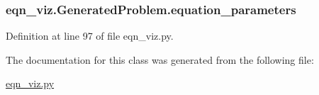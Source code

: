 \subsubsection[{equation\+\_\+parameters}]{\setlength{\rightskip}{0pt plus 5cm}eqn\+\_\+viz.\+Generated\+Problem.\+equation\+\_\+parameters}\label{classeqn__viz_1_1_generated_problem_a2e0f51cffcc4ffbaba5f48e7b537e93b}


Definition at line 97 of file eqn\+\_\+viz.\+py.



The documentation for this class was generated from the following file\+:\begin{DoxyCompactItemize}
\item 
\hyperlink{eqn__viz_8py}{eqn\+\_\+viz.\+py}\end{DoxyCompactItemize}
